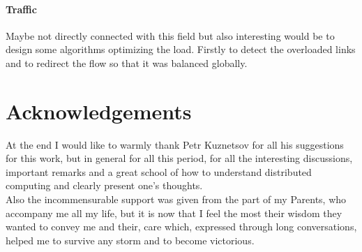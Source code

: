 \documentclass{article}
\theoremstyle{remark}
\begin{document}
\paragraph{Traffic} Maybe not directly connected with this field but also interesting would be to design some algorithms optimizing the load. Firstly to detect the overloaded links and to redirect the flow so that it was balanced globally.
\section{Acknowledgements}
At the end I would like to warmly thank Petr Kuznetsov for all his suggestions for this work, but in general for all this period, for all the interesting discussions, important remarks and a great school of how to understand distributed  computing and clearly present one's thoughts.\\
Also the incommensurable support was given from the part of my Parents, who accompany me all my life, but it is now that I feel the most their wisdom they wanted to convey me and their, care which, expressed through long conversations, helped me to survive any storm and to become victorious.



\end{document}
